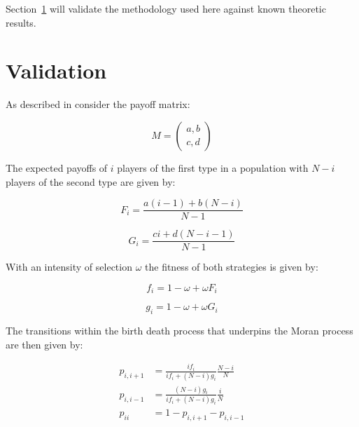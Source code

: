 \documentclass{article}
\begin{document}
Section~\ref{sec:validation} will validate the methodology used here against
known theoretic results.

\section{Validation}\label{sec:validation}

As described in \cite{Nowak} consider the payoff matrix:

\begin{equation}\label{equ:payoff_matrix}
    M = \begin{pmatrix}
        a, b\\
        c, d
        \end{pmatrix}
\end{equation}

The expected payoffs of \(i\) players of the first type in a population with \(N
- i\) players of the second type are given by:

\begin{equation}\label{equ:expected_payoff_one}
    F_i = \frac{a(i - 1) + b(N - i)}{N - 1}
\end{equation}

\begin{equation}\label{equ:expected_payoff_two}
    G_i = \frac{ci + d(N - i - 1)}{N - 1}
\end{equation}

With an intensity of selection \(\omega\) the fitness of both strategies is
given by:

\begin{equation}\label{equ:expected_payoff_one}
    f_i = 1 - \omega + \omega F_i
\end{equation}

\begin{equation}\label{equ:expected_payoff_two}
    g_i = 1 - \omega + \omega G_i
\end{equation}

The transitions within the birth death process that underpins the Moran process
are then given by:

\begin{align}
    p_{i, i+1}&= \frac{if_i}{if_i+(N-i)g_i}\frac{N-i}{N}\label{equ:p_up}\\
    p_{i, i-1}&= \frac{(N-i)g_i}{if_i+(N-i)g_i}\frac{i}{N}\label{equ:p_down}\\
    p_{ii} &= 1 - p_{i, i+1} - p_{i, i-1}\label{equ:p_stay}
\end{align}
\end{document}
